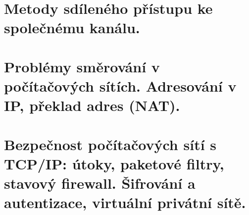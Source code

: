 \documentclass[twoside]{book}
\begin{document}
\chapter{Metody sdíleného přístupu ke společnému kanálu. }

\clearpage

\chapter{Problémy směrování v počítačových sítích. Adresování v IP, překlad adres (NAT). }

\clearpage

\chapter{Bezpečnost počítačových sítí s TCP/IP: útoky, paketové filtry, stavový firewall. Šifrování a autentizace, virtuální privátní sítě.  }

\clearpage
\end{document}
